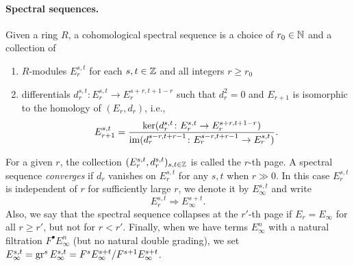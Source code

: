 \paragraph{Spectral sequences.} Given a ring $R$, a cohomological spectral sequence is a choice of $r_0 \in \mathbb{N}$ and a collection of
\begin{enumerate}[$\bullet$]
  \item $R$-modules $E_r^{s,t}$ for each $s,t \in \mathbb{Z}$ and all integers $r \geq r_0$
  \item differentials $d_r^{s,t} \colon E_r^{s,t} \to E_r^{s+r,t+1-r}$ such that $d_r^2 = 0$ and $E_{r+1}$ is isomorphic to the homology of $(E_r,d_r)$, i.e.,
  \[
    E_{r+1}^{s,t} = \frac{\operatorname{ker}(d_r^{s,t} \colon E_r^{s,t} \to E_r^{s+r,t+1-r})}{\operatorname{im}(d_r^{s-r,t+r-1} \colon E_r^{s-r,t+r-1} \to E_r^{s,t})}.
  \]
\end{enumerate}
For a given $r$, the collection $(E_r^{s,t},d_r^{s,t})_{s,t\in\mathbb{Z}}$ is called the $r$-th page. A spectral sequence \emph{converges} if $d_r$ vanishes on $E_r^{s,t}$ for any $s,t$ when $r\gg0$. In this case $E_r^{s,t}$ is independent of $r$ for sufficiently large $r$, we denote it by $E_{\infty}^{s,t}$ and write
  \[
    E_{r}^{s,t} \Longrightarrow E_\infty^{s+t}.
  \]
Also, we say that the spectral sequence collapses at the $r'$-th page if $E_{r} = E_{\infty}$ for all $r \geq r'$, but not for $r < r'$. Finally, when we have terms $E_\infty^{n}$  with a natural filtration $F^\bullet E_\infty^n$ (but no natural double grading), we set $E_\infty^{s,t} = \operatorname{gr}^{s} E_\infty^{s,t}= F^{s}E_\infty^{s+t}/F^{s+1}E_\infty^{s+t}$.




